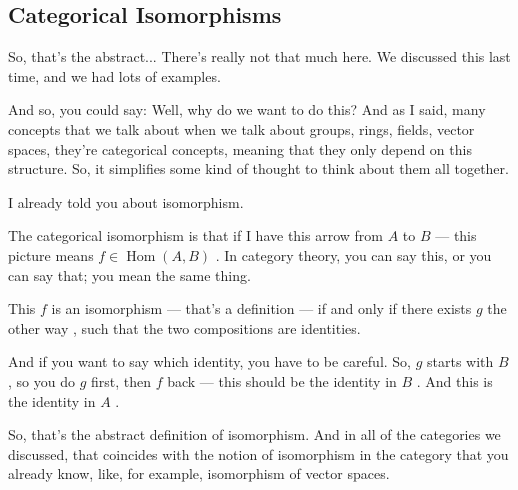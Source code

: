 \subsection{Categorical Isomorphisms}

\begin{speech}[00:03:45 - 00:05:37]
So, that's the abstract... There's really not that much here. We discussed this last time, and we had lots of examples.

And so, you could say: Well, why do we want to do this? And as I said, many concepts that we talk about when we talk about groups, rings, fields, vector spaces, they're categorical concepts, meaning that they only depend on this structure. So, it simplifies some kind of thought to think about them all together.

I already told you about isomorphism. 

The categorical isomorphism is that if I have this arrow from $A$ to $B$  --- this picture means $f \in \operatorname{Hom}(A, B)$ . In category theory, you can say this, or you can say that; you mean the same thing.

This $f$ is an isomorphism  --- that's a definition --- if and only if there exists $g$ the other way , such that  the two compositions are identities.

And if you want to say which identity, you have to be careful. So, $g$ starts with $B$, so you do $g$ first, then $f$ back --- this should be the identity in $B$ . And this is the identity in $A$ .

So, that's the abstract definition of isomorphism. And in all of the categories we discussed, that coincides with the notion of isomorphism in the category that you already know, like, for example, isomorphism of vector spaces.
\end{speech}

\begin{hidden}
\end{hidden}

